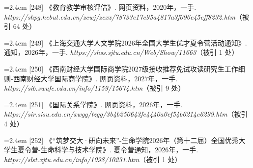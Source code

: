 {\vspace{0.6pt}
\vspace{3.5pt}\par
\nopagebreak\vspace{1pt}
\noindent\hangindent=2.4em \label{src:S0318}{\color{cAccent}[248]} 《教育教学审核评估》. 网页资料，2020年，一手. \textit{https://shpg.hebut.edu.cn/zcwj/zcxx/78733e17c95a4817a3f096e45eff8232.htm}（被引 64 处）\par
\vspace{0.6pt}
\vspace{3.5pt}\par
\nopagebreak\vspace{1pt}
\noindent\hangindent=2.4em \label{src:S0319}{\color{cAccent}[249]} 《上海交通大学人文学院2026年全国大学生优才夏令营活动通知》. 通知，2026年，一手. \textit{https://shss.sjtu.edu.cn/Web/Show/11663}（被引 1 处）\par
\vspace{0.6pt}
\vspace{3.5pt}\par
\nopagebreak\vspace{1pt}
\noindent\hangindent=2.4em \label{src:S0320}{\color{cAccent}[250]} 《西南财经大学国际商学院2027级接收推荐免试攻读研究生工作细则-西南财经大学国际商学院》. 网页资料，2027年，一手. \textit{https://sib.swufe.edu.cn/info/1159/15674.htm}（被引 9 处）\par
\vspace{0.6pt}
\vspace{3.5pt}\par
\nopagebreak\vspace{1pt}
\noindent\hangindent=2.4em \label{src:S0322}{\color{cAccent}[251]} 《国际关系学院》. 网页资料，2026年，一手. \textit{https://sir.sisu.edu.cn/xwgg/tzgg/3b4b250643fe4440a0ef54b6214c6299.htm}（被引 4 处）\par
\vspace{0.6pt}
\vspace{3.5pt}\par
\nopagebreak\vspace{1pt}
\noindent\hangindent=2.4em \label{src:S0323}{\color{cAccent}[252]} 《“筑梦交大·研向未来”-生命学院2026年（第十二届）全国优秀大学生夏令营-生命科学与技术学院》. 夏令营通知，2026年，一手. \textit{https://slst.xjtu.edu.cn/info/1098/10231.htm}（被引 1 处）\par
}
